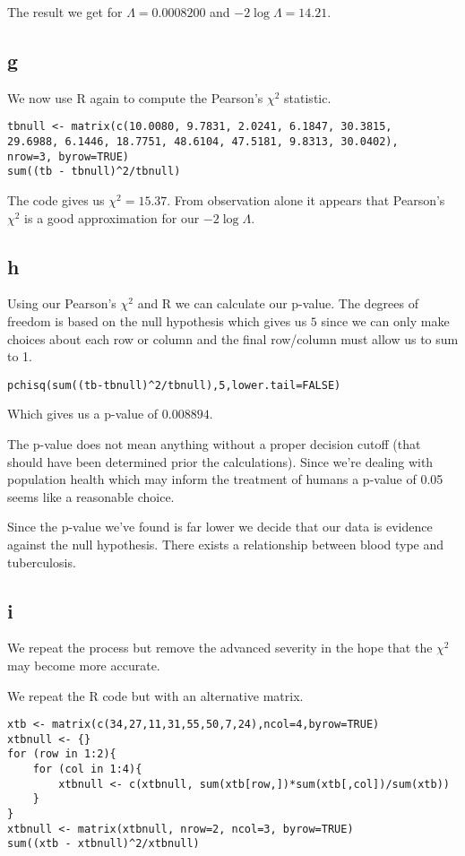 \documentclass{article}
\begin{document}
The result we get for $\Lambda = 0.0008200$ and $-2\log\Lambda = 14.21$.

\subsection{g}
We now use R again to compute the Pearson's $\chi^2$ statistic.
\begin{verbatim}
tbnull <- matrix(c(10.0080, 9.7831, 2.0241, 6.1847, 30.3815,
29.6988, 6.1446, 18.7751, 48.6104, 47.5181, 9.8313, 30.0402),
nrow=3, byrow=TRUE)
sum((tb - tbnull)^2/tbnull)
\end{verbatim}

The code gives us $\chi^2 = 15.37$. From observation alone it appears that
Pearson's $\chi^2$ is a good approximation for our $-2\log\Lambda$.

\subsection{h}
Using our Pearson's $\chi^2$ and R we can calculate our p-value.
The degrees of freedom is based on the null hypothesis which gives us $5$ since
we can only make choices about each row or column and the final row/column must
allow us to sum to 1.
\begin{verbatim}
pchisq(sum((tb-tbnull)^2/tbnull),5,lower.tail=FALSE)
\end{verbatim}

Which gives us a p-value of $0.008894$.

The p-value does not mean anything without a proper decision cutoff
(that should have been determined prior the calculations). Since we're
dealing with population health which may inform the treatment of humans a
p-value of 0.05 seems like a reasonable choice.

Since the p-value we've found is far lower we decide that our data is evidence
against the null hypothesis. There exists a relationship between
blood type and tuberculosis.

\subsection{i}
We repeat the process but remove the advanced severity in the
hope that the $\chi^2$ may become more accurate.

We repeat the R code but with an alternative matrix.
\begin{verbatim}
xtb <- matrix(c(34,27,11,31,55,50,7,24),ncol=4,byrow=TRUE)
xtbnull <- {}
for (row in 1:2){
    for (col in 1:4){
        xtbnull <- c(xtbnull, sum(xtb[row,])*sum(xtb[,col])/sum(xtb))
    }
}
xtbnull <- matrix(xtbnull, nrow=2, ncol=3, byrow=TRUE)
sum((xtb - xtbnull)^2/xtbnull)
\end{verbatim}
\end{document}
